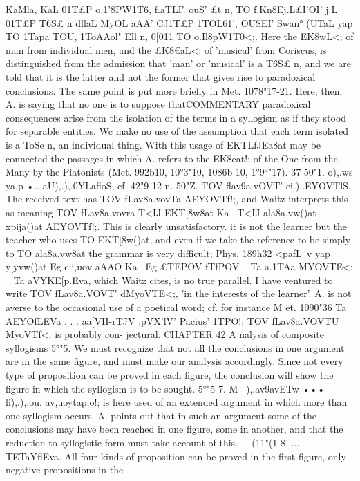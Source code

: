{{{{{{{{{{{{{{{{{{{{{{{{{{{{{{{{{{{{KaMla, KaL 01T£P o.1'8PW1T6, f.aTLI'. ouS' £t n, TO f.Kn8Ej.L£I'OI' j.L~
01T£P T6S£ n dllaL MyOL aAA' CJ1T£P 1TOL61', OUSEI' Sw{an° (UTaL yap TO
1Tapa TOU, 1ToAAol" Ell n, 0[011 TO o.Il8pW1T0<;. Here the EK8wL<; of man
from individual men, and the £K8€aL<; of 'musical' from Coriscus,
is distinguished from the admission that 'man' or 'musical' is
a T6S£ n, and we are told that it is the latter and not the former
that gives rise to paradoxical conclusions. The same point is
put more briefly in Met. 1078"17-21.
Here, then, A. is saying that no one is to suppose thatCOMMENTARY
paradoxical consequences arise from the isolation of the terms
in a syllogism as if they stood for separable entities. Wc make
no use of the assumption that each term isolated is a ToSe n,
an individual thing.
With this usage of EKTLfJEa8at may be connected the passages in
which A. refers to the EK8eat!; of the One from the Many by the
Platonists (Met. 992b10, 10°3"10, 1086b 10, 1°9°"17).
37-50"1. o),.ws ya.p •.. aU),.),.0YLafloS, cf. 42"9-12 n.
50"Z. TOV flav9a.vOVT' ci.),.EYOVTlS. The received text has TOV
fLav8a.vovTa AEYOVTf!;, and Waitz interprets this as meaning TOV
fLav8a.vovra T<IJ EKT[8w8at Ka~ T<IJ ala8a.vw()at xpija()at AEYOVTf!;. This
is clearly unsatisfactory. it is not the learner but the teacher who
uses TO EKT[8w()at, and even if we take the reference to be simply
to TO ala8a.vw8at the grammar is very difficult; Phys. 189h32
<pafL~v yap y[yvw()at
Eg
c:i,uov aAAO Ka~
Eg
£TEPOV fTfPOV ~ Ta a.1TAa
MYOVTE<; ~ Ta aVYKE[p.Eva,
which Waitz cites, is no true parallel.
I have ventured to write TOV fLav8a.VOVT' dMyoVTE<;, 'in the interests
of the learner'. A. is not averse to the occasional use of a poetical
word; cf. for instance M et. 1090"36 Ta AEYOfLEVa . . . aa[VH-rTJV
,pVX'lV'
Pacius' 1TPO!; TOV fLav8a.VOVTU MyoVTf<; is probably con-
jectural.
CHAPTER 42
A nalysis of composite syllogisms
5°"5. We must recognize that not all the conclusions in one
argument are in the same figure, and must make our analysis
accordingly. Since not every type of proposition can be proved
in each figure, the conclusion will show the figure in which the
syllogism is to be sought.
5°"5-7. M~ ),.av9avETw ••• li),.),.ou. av,uoytap.o!; is here used of
an extended argument in which more than one syllogism occurs.
A. points out that in such an argument some of the conclusions
may have been reached in one figure, some in another, and that
the reduction to syllogistic form must take account of this.
~. (11"(1 8' ... TETaYflEva. All four kinds of proposition can
be proved in the first figure, only negative propositions in the
}}}}}}}}}}}}}}}}}}}}}}}}}}}}}}}}}}}}}
